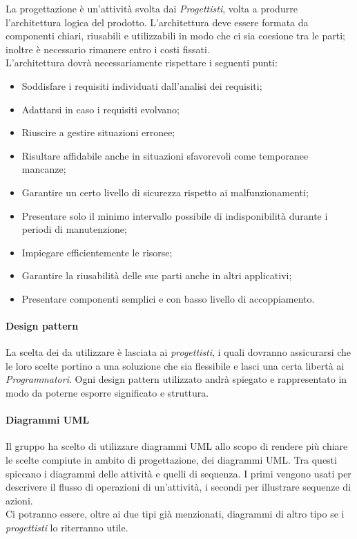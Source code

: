 La progettazione è un'attività svolta dai \emph{Progettisti}, volta a produrre l'architettura logica del prodotto.
L'architettura deve essere formata da componenti chiari, riusabili e utilizzabili in modo che ci sia coesione tra
le parti; inoltre è necessario rimanere entro i costi fissati.\\
L'architettura dovrà necessariamente rispettare i seguenti punti:
\begin{itemize}
    \item Soddisfare i requisiti individuati dall'analisi dei requisiti;
    \item Adattarsi in caso i requisiti evolvano;
    \item Riuscire a gestire situazioni erronee;
    \item Risultare affidabile anche in situazioni sfavorevoli come temporanee mancanze;
    \item Garantire un certo livello di sicurezza rispetto ai malfunzionamenti;
    \item Presentare solo il minimo intervallo possibile di indisponibilità durante i periodi di manutenzione;
    \item Impiegare efficientemente le risorse;
    \item Garantire la riusabilità delle sue parti anche in altri applicativi;
    \item Presentare componenti semplici e con basso livello di accoppiamento.
\end{itemize}

\paragraph{Design pattern}

La scelta dei  da utilizzare è lasciata ai \emph{progettisti}, i quali dovranno
assicurarsi che le loro scelte portino a una soluzione che sia flessibile e lasci una certa libertà ai
\emph{Programmatori}. Ogni design pattern utilizzato andrà spiegato e rappresentato in modo da poterne esporre
significato e struttura.

\paragraph{Diagrammi UML}

Il gruppo ha scelto di utilizzare diagrammi UML allo scopo di rendere più chiare le scelte compiute in ambito di
progettazione, dei diagrammi UML. Tra questi spiccano i diagrammi delle attività e quelli di sequenza. I primi vengono
usati per descrivere il flusso di operazioni di un'attività, i secondi per illustrare sequenze di azioni.\\
Ci potranno essere, oltre ai due tipi già menzionati, diagrammi di altro tipo se i \emph{progettisti} lo riterranno
utile.

